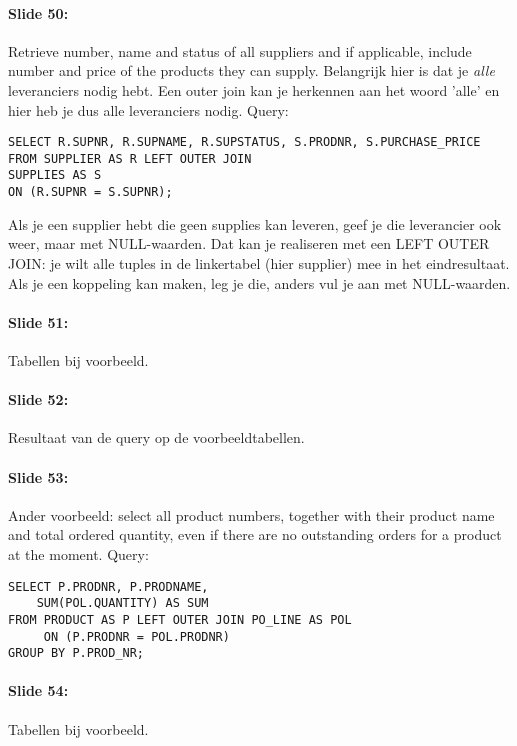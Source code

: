 \documentclass[10pt,a4paper]{report}
\begin{document}
\paragraph{Slide 50:}Retrieve number, name and status of all suppliers and if applicable, include number and price of the products they can supply. Belangrijk hier is dat je \emph{alle} leveranciers nodig hebt. Een outer join kan je herkennen aan het woord 'alle' en hier heb je dus alle leveranciers nodig. Query:

\begin{verbatim}
SELECT R.SUPNR, R.SUPNAME, R.SUPSTATUS, S.PRODNR, S.PURCHASE_PRICE
FROM SUPPLIER AS R LEFT OUTER JOIN
SUPPLIES AS S
ON (R.SUPNR = S.SUPNR);
\end{verbatim}
Als je een supplier hebt die geen supplies kan leveren, geef je die leverancier ook weer, maar met NULL-waarden. Dat kan je realiseren met een LEFT OUTER JOIN: je wilt alle tuples in de linkertabel (hier supplier) mee in het eindresultaat. Als je een koppeling kan maken, leg je die, anders vul je aan met NULL-waarden.

\paragraph{Slide 51:}Tabellen bij voorbeeld.

\paragraph{Slide 52:}Resultaat van de query op de voorbeeldtabellen.

\paragraph{Slide 53:}Ander voorbeeld: select all product numbers, together with their product name and total ordered quantity, even if there are no outstanding orders for a product at the moment. Query:

\begin{verbatim}
SELECT P.PRODNR, P.PRODNAME,
	SUM(POL.QUANTITY) AS SUM
FROM PRODUCT AS P LEFT OUTER JOIN PO_LINE AS POL
	 ON (P.PRODNR = POL.PRODNR)
GROUP BY P.PROD_NR;
\end{verbatim}

\paragraph{Slide 54:}Tabellen bij voorbeeld.
\end{document}
